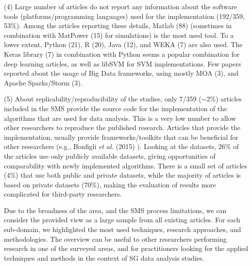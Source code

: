 \documentclass[journal]{IEEEtran}
\begin{document}
\noindent (4) Large number of articles do not report any information about the software tools (platforms/programming languages) used for the implementation (192/359, 53\%). Among the articles reporting these details, Matlab (88) (sometimes in combination with MatPower (15) for simulations) is the most used tool. To a lower extent, Python (21), R (20), Java (12), and WEKA (7) are also used. The Keras library (7) in combination with Python seems a popular combination for deep learning articles, as well as libSVM for SVM implementations. Few papers reported about the usage of Big Data frameworks, using mostly MOA (3), and Apache Sparks/Storm (3).

\noindent (5) About replicability/reproducibility of the studies, only 7/359 ($\sim$2\%) articles included in the SMS provide the source code for the implementation of the algorithms that are used for data analysis. This is a very low number to allow other researchers to reproduce the published research. Articles that provide the implementation, usually provide frameworks/toolkits that can be beneficial for other researchers (e.g., Bonfigli \textit{et al.} (2015) ). Looking at the datasets, 26\% of the articles use only publicly available datasets, giving opportunities of comparability with newly implemented algorithms. There is a small set of articles (4\%) that use both public and private datasets, while the majority of articles is based on private datasets (70\%), making the evaluation of results more complicated for third-party researchers.

Due to the broadness of the area, and the SMS process limitations, we can consider the provided view as a large sample from all existing articles. For each sub-domain, we highlighted the most used techniques, research approaches, and methodologies. The overview can be useful to other researchers performing research in one of the surveyed areas, and for practitioners looking for the applied techniques and methods in the context of SG data analysis studies.



\end{document}
